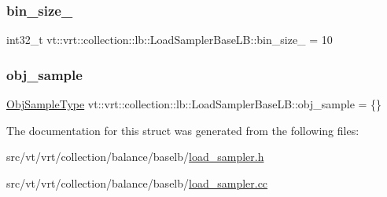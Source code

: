 \subsubsection{\texorpdfstring{bin\+\_\+size\+\_\+}{bin\_size\_}}
{\footnotesize\ttfamily int32\+\_\+t vt\+::vrt\+::collection\+::lb\+::\+Load\+Sampler\+Base\+L\+B\+::bin\+\_\+size\+\_\+ = 10\hspace{0.3cm}{\ttfamily [protected]}}

\mbox{\label{structvt_1_1vrt_1_1collection_1_1lb_1_1_load_sampler_base_l_b_afeeba35f0a0a1fa71dc438270303006f}} 
\subsubsection{\texorpdfstring{obj\+\_\+sample}{obj\_sample}}
{\footnotesize\ttfamily \hyperlink{structvt_1_1vrt_1_1collection_1_1lb_1_1_load_sampler_base_l_b_a8d939a849ec0d6371c1c4d441ffb9b94}{Obj\+Sample\+Type} vt\+::vrt\+::collection\+::lb\+::\+Load\+Sampler\+Base\+L\+B\+::obj\+\_\+sample = \{\}\hspace{0.3cm}{\ttfamily [protected]}}



The documentation for this struct was generated from the following files\+:\begin{DoxyCompactItemize}
\item 
src/vt/vrt/collection/balance/baselb/\hyperlink{load__sampler_8h}{load\+\_\+sampler.\+h}\item 
src/vt/vrt/collection/balance/baselb/\hyperlink{load__sampler_8cc}{load\+\_\+sampler.\+cc}\end{DoxyCompactItemize}
